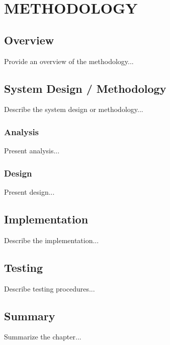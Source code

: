 
\chapter{METHODOLOGY}

\ifpdf
    \graphicspath{{methodology/figures/PNG}{methodology/figures/PDF}{methodology/figures}}
\else
    \graphicspath{{methodology/figures/EPS}{methodology/figures}}
\fi

\section{Overview}
Provide an overview of the methodology...

\section{System Design / Methodology}
Describe the system design or methodology...

\subsection{Analysis}
Present analysis...

\subsection{Design}
Present design...

\section{Implementation}
Describe the implementation...

\section{Testing}
Describe testing procedures...

\section{Summary}
Summarize the chapter...
